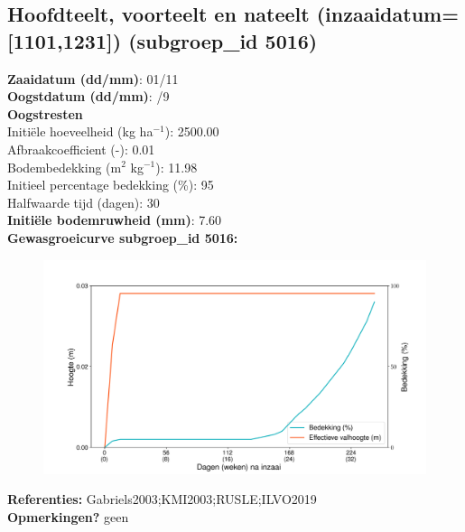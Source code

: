 \documentclass{article}
\begin{document}
 \subsection{Hoofdteelt, voorteelt en nateelt (inzaaidatum=[1101,1231]) (subgroep\_id 5016)} 
  \textbf{Zaaidatum (dd/mm)}: 01/11  \vspace{0.10cm} \\ 
  \textbf{Oogstdatum (dd/mm)}: /9  \vspace{0.10cm} \\ 
  \textbf{Oogstresten} \vspace{0.05cm} \\ 
  \tab Initi\"{e}le hoeveelheid (kg ha$^{-1}$): 2500.00 \vspace{0.05cm} \\ 
  \tab Afbraakcoefficient (-): 0.01 \vspace{0.05cm} \\ 
  \tab Bodembedekking (m$^2$ kg$^{-1}$): 11.98 \vspace{0.05cm} \\ 
  \tab Initieel percentage bedekking (\%): 95 \vspace{0.05cm} \\ 
  \tab Halfwaarde tijd (dagen): 30 \vspace{0.05cm} \\ 
  \textbf{Initi\"{e}le bodemruwheid (mm)}: 7.60 \vspace{0.05cm} \\ 
  \textbf{Gewasgroeicurve subgroep\_id 5016:} 
 \begin{center} \begin{figure}[H] \includegraphics[width=12.5cm]{temp/5016.png} \end{figure} \end{center} 
  \textbf{Referenties:} Gabriels2003;KMI2003;RUSLE;ILVO2019 \vspace{0.10cm} \\ 
  \textbf{Opmerkingen?} geen \vspace{0.10cm} \\ 
 \newpage 
\end{document}
